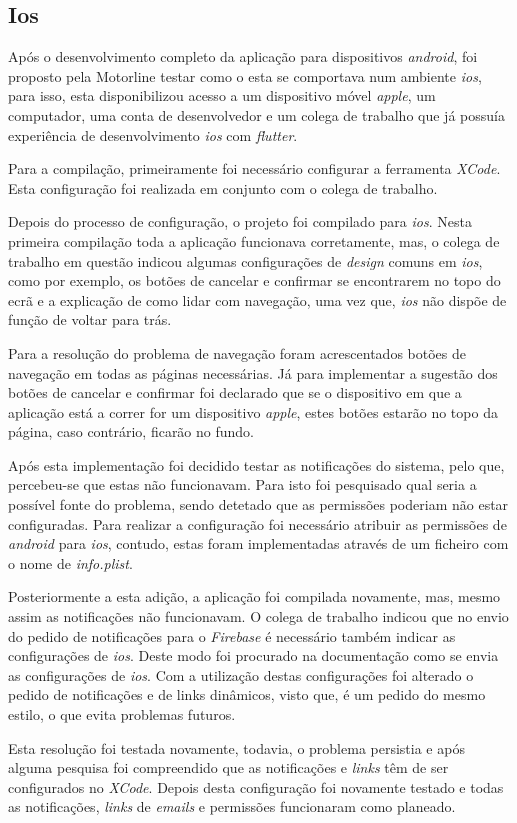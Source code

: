 \subsection{Ios}
Após o desenvolvimento completo da aplicação para dispositivos \textit{android}, foi proposto pela Motorline testar como o esta se comportava num ambiente \textit{ios}, para isso, esta disponibilizou acesso a um dispositivo móvel \textit{apple}, um computador, uma conta de desenvolvedor e um colega de trabalho que já possuía experiência de desenvolvimento \textit{ios} com \textit{flutter}.

Para a compilação, primeiramente foi necessário configurar a ferramenta \textit{XCode}. Esta configuração foi realizada em conjunto com o colega de trabalho.

Depois do processo de configuração, o projeto foi compilado para \textit{ios}. Nesta primeira compilação toda a aplicação funcionava corretamente, mas, o colega de trabalho em questão indicou algumas configurações de \textit{design} comuns em \textit{ios}, como por exemplo, os botões de cancelar e confirmar se encontrarem no topo do ecrã e a explicação de como lidar com navegação, uma vez que, \textit{ios} não dispõe de função de voltar para trás.

Para a resolução do problema de navegação foram acrescentados botões de navegação em todas as páginas necessárias. Já para implementar a sugestão dos botões de cancelar e confirmar foi declarado que se o dispositivo em que a aplicação está a correr for um dispositivo \textit{apple}, estes botões estarão no topo da página, caso contrário, ficarão no fundo.

Após esta implementação foi decidido testar as notificações do sistema, pelo que, percebeu-se que estas não funcionavam. Para isto foi pesquisado qual seria a possível fonte do problema, sendo detetado que as permissões poderiam não estar configuradas. Para realizar a configuração foi necessário atribuir as permissões de \textit{android} para \textit{ios}, contudo, estas foram implementadas através de um ficheiro com o nome de \textit{info.plist}.

Posteriormente a esta adição, a aplicação foi compilada novamente, mas, mesmo assim as notificações não funcionavam. O colega de trabalho indicou que no envio do pedido de notificações para o \textit{Firebase} é necessário também indicar as configurações de \textit{ios}. Deste modo foi procurado na documentação como se envia as configurações de \textit{ios}. Com a utilização destas configurações foi alterado o pedido de notificações e de links dinâmicos, visto que, é um pedido do mesmo estilo, o que evita problemas futuros.

Esta resolução foi testada novamente, todavia, o problema persistia e após alguma pesquisa foi compreendido que as notificações e \textit{links} têm de ser configurados no \textit{XCode}. Depois desta configuração foi novamente testado e todas as notificações, \textit{links} de \textit{emails} e permissões funcionaram como planeado.